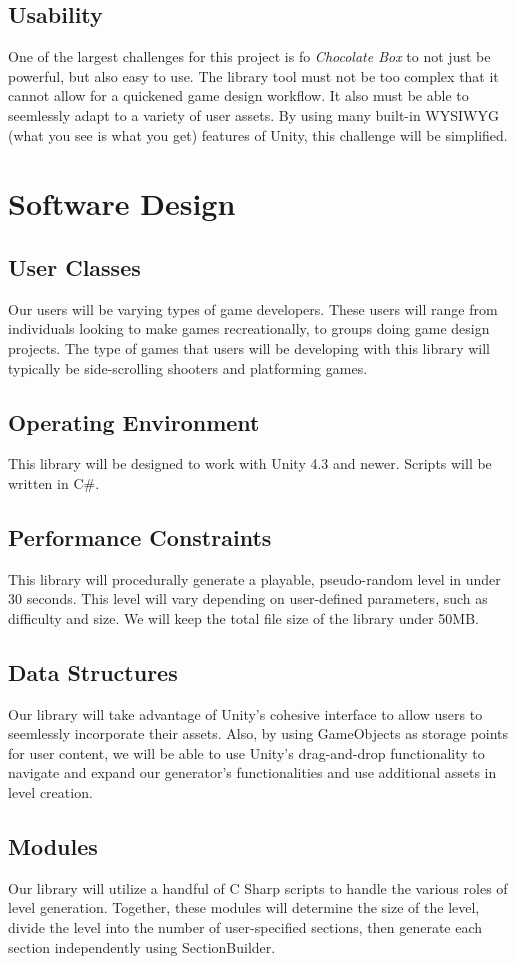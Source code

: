 \documentclass[pdftex,12pt,letter]{article}
\begin{document}
\begin{itemize}
\begin{itemize}
\begin{itemize}
\subsection{Usability}
One of the largest challenges for this project is fo \textit{Chocolate Box} to not just be powerful, but also easy to use. The library tool must not be too complex that it cannot allow for a quickened game design workflow. It also must be able to seemlessly adapt to a variety of user assets. By using many built-in WYSIWYG (what you see is what you get) features of Unity, this challenge will be simplified. 


\section{Software Design}
\subsection{User Classes}
Our users will be varying types of game developers. These users will range from individuals looking to make games recreationally, to groups doing game design projects. The type of games that users will be developing with this library will typically be side-scrolling shooters and platforming games.
\subsection{Operating Environment}
This library will be designed to work with Unity 4.3 and newer. Scripts will be written in C\#.
\subsection{Performance Constraints}
This library will procedurally generate a playable, pseudo-random level in under 30 seconds. This level will vary depending on user-defined parameters, such as difficulty and size. We will keep the total file size of the library under 50MB.
\subsection{Data Structures}
Our library will take advantage of Unity's cohesive interface to allow users to seemlessly incorporate their assets.  Also, by using GameObjects as storage points for user content, we will be able to use Unity's drag-and-drop functionality to navigate and expand our generator's functionalities and use additional assets in level creation.
\subsection{Modules}\label{Modules}
Our library will utilize a handful of C Sharp scripts to handle the various roles of level generation. Together, these modules will determine the size of the level, divide the level into the number of user-specified sections, then generate each section independently using SectionBuilder. 
\begin{itemize}


\end{itemize}
\end{itemize}
\end{itemize}
\end{itemize}
\end{document}
